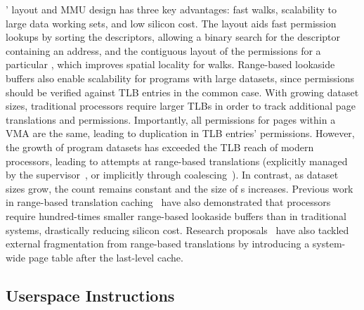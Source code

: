 \seccells' \ptable layout and MMU design has three
key advantages: fast \ptable walks, scalability to large data 
working sets, and low silicon cost.
The \ptable layout aids fast permission lookups by
sorting the \cell descriptors, allowing a binary search
for the \cell descriptor containing an address, 
and the contiguous layout of the permissions for a particular
\secdiv, which improves spatial locality for \ptable walks.
Range-based lookaside buffers also enable scalability for
programs with large datasets, since permissions should be 
verified against TLB entries in the common case.
With growing dataset sizes, traditional processors require larger 
TLBs in order to track additional page translations and permissions.
Importantly, all permissions for pages within a VMA are
the same, leading to duplication in TLB entries' permissions.
However, the growth of program datasets has exceeded the
TLB reach of modern processors, leading to attempts at 
range-based translations (explicitly managed by the 
supervisor~\cite{YanLNB19}, or implicitly through 
coalescing~\cite{PhamVJB12}).
In contrast, as dataset sizes grow, the \cell count remains 
constant and the size of \cell{}s increases.
Previous work in range-based translation caching~\cite{YanLNB19,0003BOBFP21midgard} 
have also demonstrated that 
processors require hundred-times smaller range-based lookaside buffers 
than in traditional systems, drastically reducing silicon cost.
Research proposals~\cite{0003BOBFP21midgard, ZhangSRL10} 
have also tackled
external fragmentation from range-based translations 
by introducing a system-wide page table after the
last-level cache.

\subsection{Userspace Instructions}
\label{sec:seccells:design:instructions}

